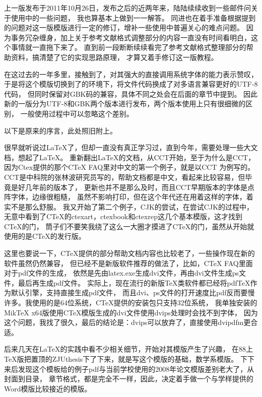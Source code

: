 \begin{preface}
上一版发布于2011年10月26日，发布之后的近两年来，陆陆续续收到一些邮件问关于使用中的一些问题，
我也算基本上做到一一解答。
同进也在着手准备根据提到的问题对这一版模版进行一定的修订，增补一些使用中普遍关心的难点问题。
因为事务冗杂缠身，加上关于参考文献格式调整部分的内容一直没有时间看明白，这个事情就一直拖下来了。
直到前一段断断续续看完了参考文献格式整理部分的帮助资料，搞清楚了它的实现思路原理，
才算又着手修订这一版教程。

在这过去的一年多里，接触到了\XeTeX{}，对其强大的直接调用系统字体的能力表示赞叹，
于是将这个模版切换到了\XeTeX{}的环境下，将文件代码换成了对多语言兼容更好的UTF-8代码，
但同时保留对GBK码的兼容，具体不同之处会在后面的章节中提到。
因此新的一版分为UTF-8和GBK两个版本进行发布，两个版本使用上只有很细微的区别，
一般使用过程中可以忽略这个差别。

以下是原来的序言，此处照旧附上。


很早就听说过\LaTeX\index{\LaTeX}了，但却一直没有真正学习过，直到今年，需要处理一些大文档，想起了\LaTeX{}。
重新翻出\LaTeX{}的文档，从CCT开始，至于为什么是CCT，
因为Ctex提供的那个CTeX FAQ里对中文的第一个例子，就是以CCT
为例写的。
CCT是中科院的张林波研究员写的，帮助文档都是中文，看起来比较容易，但毕竟是好几年前的版本了，
更新也并不是那么及时，而且CCT早期版本的字体是点阵字体，边缘很粗糙，
虽然不影响打印，但在这个年代还在用着这样的字体，着实不是那么舒服。
我又开始了第二个例子，CJK的尝试，在尝试CJK的过程中，
无意中看到了CTeX的ctexart，ctexbook和ctexrep这几个基本模版，这才找到CTeX的门，
筒子们不要笑我绕了这么一大圈才摸进了CTeX的门，虽然从开始就使用的是CTeX的发行版。

这里也要说一下，CTeX提供的部分帮助文档内容也比较老了，一些操作现在新的软件虽然仍然兼容，
但已经不是新版软件推荐的做法了，比如，CTeX FAQ里面对于pdf文件的生成，
依然是先由latex.exe生成dvi文件，再由dvi文件生成ps文件，最后再生成pdf文件。
实际上，现在流行的新版\TeX{}类软件都已经将pdfTeX作为默认引擎，支持直接生成pdf文件，
而且dvi、ps文件的打开速度比pdf反而要慢许多。我使用的是64位系统，CTeX提供的安装包只支持32位系统，
我单独安装的MikTeX x64版使用CTeX模版生成的dvi文件使用dvips处理时会找不到字体，
因为这个问题，我找了很久，最后的结论是：dvips可以放弃了，直接使用dvipdfm更合适。

后来几天在\LaTeX{}的实践中看不少相关细节，开始对其模版产生了兴趣，
在88上\TeX{}版把置顶的ZJUthesis下了下来，就是写这个模版的基础，数学系模版。
下下来后发现这个模板给的例子pdf与当前学校使用的2008年论文模版差别老大了，从封面到目录，
章节格式，都是完全不一样，因此，决定着手做一个与学样提供的Word模版比较接近的模版。


\end{preface}
